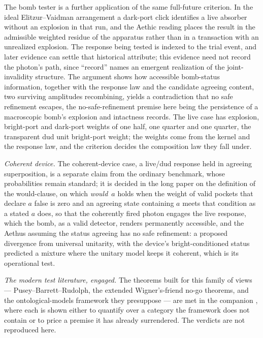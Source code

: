 \documentclass[11pt]{article}
\theoremstyle{definition}
\begin{document}
The bomb tester \cite{elitzur1993quantum} is a further application of the same full-future criterion. In the ideal Elitzur--Vaidman arrangement a dark-port click identifies a live absorber without an explosion in that run, and the Aethic reading places the result in the admissible weighted residue of the apparatus rather than in a transaction with an unrealized explosion. The response being tested is indexed to the trial event, and later evidence can settle that historical attribute; this evidence need not record the photon's path, since ``record'' names an emergent realization of the joint-invalidity structure. The argument shows how accessible bomb-status information, together with the response law and the candidate agreeing content, two surviving amplitudes recombining, yields a contradiction that no safe refinement escapes, the no-safe-refinement premise here being the persistence of a macroscopic bomb's explosion and intactness records. The live case has explosion, bright-port and dark-port weights of one half, one quarter and one quarter, the transparent dud unit bright-port weight; the weights come from the kernel and the response law, and the criterion decides the composition law they fall under. 

\textit{Coherent device.} The coherent-device case, a live/dud response held in agreeing superposition, is a separate claim from the ordinary benchmark, whose probabilities remain standard; it is decided in the long paper on the definition of the would-clause, on which \emph{would}~$a$ holds when the weight of valid pockets that declare $a$ false is zero and an agreeing state containing $a$ meets that condition as a stated $a$ does, so that the coherently fired photon engages the live response, which the bomb, as a valid detector, renders permanently accessible, and the Aethus assuming the status agreeing has no safe refinement: a proposed divergence from universal unitarity, with the device's bright-conditioned status predicted a mixture where the unitary model keeps it coherent, which is its operational test.

\emph{The modern test literature, engaged.} The theorems built for this family of views --- Pusey--Barrett--Rudolph, the extended Wigner's-friend no-go theorems, and the ontological-models framework they presuppose --- are met in the companion \cite{AethusRealist}, where each is shown either to quantify over a category the framework does not contain or to price a premise it has already surrendered. The verdicts are not reproduced here.
\end{document}
